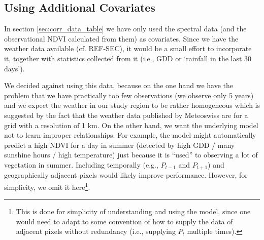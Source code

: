 {    \subsection{Using Additional Covariates}{
        In section \ref{sec:corr_data_table} we have only used the spectral data (and the observational NDVI calculated from them) as covariates. Since we have the weather data available (cf. REF-SEC), it would be a small effort to incorporate it, together with statistics collected from it (i.e., GDD or `rainfall in the last 30 days'). 

        We decided against using this data, because on the one hand we have the problem that we have practically too few observations (we observe only 5 years) and we expect the weather in our study region to be rather homogeneous which is suggested by the fact that the weather data published by Meteoswiss are for a grid with a resolution of 1 km. On the other hand, we want the underlying model not to learn improper relationships. For example, the model might automatically predict a high NDVI for a day in summer (detected by high GDD / many sunshine hours / high temperature) just because it is ``used'' to observing a lot of vegetation in summer. 
        Including temporally (e.g., $P_{t-1}$ and $P_{t+1}$) and geographically adjacent pixels would likely improve performance. However, for simplicity, we omit it here\footnote{This is done for simplicity of understanding and using the model, since one would need to adapt to some convention of how to supply the data of adjacent pixels without redundancy (i.e., supplying $P_t$ multiple times).}.
}
}

